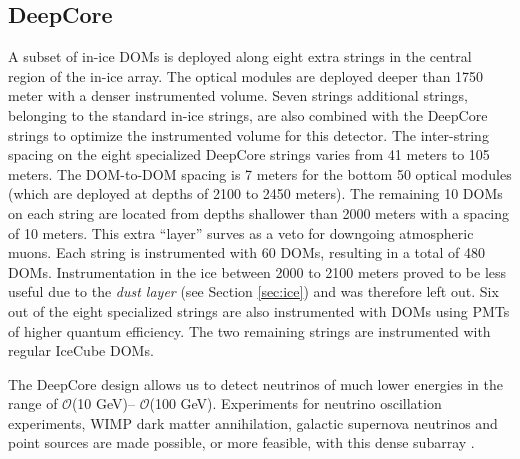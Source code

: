  
\subsection{DeepCore}
\label{subsec:DC}
A subset of in-ice DOMs is deployed along eight extra strings in the central region of the in-ice array. The optical modules are deployed deeper than 1750 meter with a denser instrumented volume. Seven strings additional strings, belonging to the standard in-ice strings, are also combined with the DeepCore strings to optimize the instrumented volume for this detector. The inter-string spacing on the eight specialized DeepCore strings varies from 41 meters to 105 meters. The DOM-to-DOM spacing is 7 meters for the bottom 50 optical modules (which are deployed at depths of 2100 to 2450 meters). The remaining 10 DOMs on each string are located from depths shallower than 2000 meters with a spacing of 10 meters. This extra ``layer'' surves as a veto for downgoing atmospheric muons. Each string is instrumented with 60 DOMs, resulting in a total of 480 DOMs. Instrumentation in the ice between 2000 to 2100 meters proved to be less useful due to the \textit{dust layer} (see Section \ref{sec:ice}) and was therefore left out. Six out of the eight specialized strings are also instrumented with DOMs using PMTs of higher quantum efficiency. The two remaining strings are instrumented with regular IceCube DOMs.

The DeepCore design allows us to detect neutrinos of much lower energies in the range of $\mathcal{O}$(10 GeV)– $\mathcal{O}$(100 GeV). Experiments for neutrino oscillation experiments, WIMP dark matter annihilation, galactic supernova neutrinos and point sources are made possible, or more feasible, with this dense subarray \cite{Collaboration:2011ym}.

